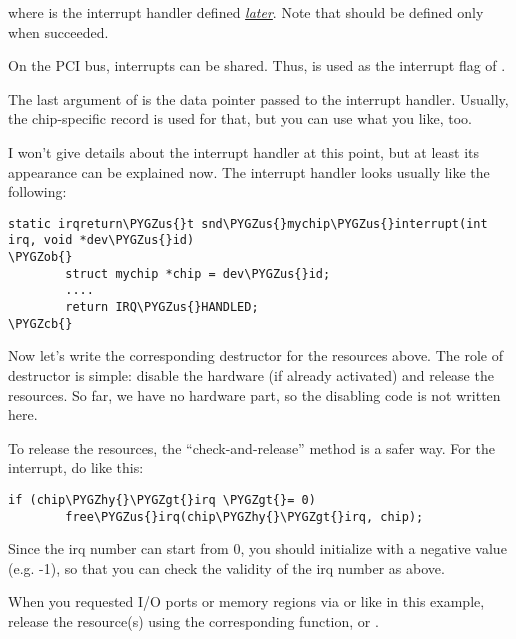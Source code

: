 \documentclass[a4paper,8pt,english]{sphinxmanual}
\def\PYGZus{\char`\_}
\def\PYGZob{\char`\{}
\def\PYGZcb{\char`\}}
\def\PYGZgt{\char`\>}
\def\PYGZhy{\char`\-}
\begin{document}
where  is the interrupt handler
defined {\hyperref[sound/kernel\string-api/writing\string-an\string-alsa\string-driver:pcm\string-interface\string-interrupt\string-handler]{\emph{later}}}. Note that
 should be defined only when 
succeeded.

On the PCI bus, interrupts can be shared. Thus,  is used
as the interrupt flag of .

The last argument of  is the data pointer
passed to the interrupt handler. Usually, the chip-specific record is
used for that, but you can use what you like, too.

I won't give details about the interrupt handler at this point, but at
least its appearance can be explained now. The interrupt handler looks
usually like the following:

\begin{Verbatim}[commandchars=\\\{\}]
static irqreturn\PYGZus{}t snd\PYGZus{}mychip\PYGZus{}interrupt(int irq, void *dev\PYGZus{}id)
\PYGZob{}
        struct mychip *chip = dev\PYGZus{}id;
        ....
        return IRQ\PYGZus{}HANDLED;
\PYGZcb{}
\end{Verbatim}

Now let's write the corresponding destructor for the resources above.
The role of destructor is simple: disable the hardware (if already
activated) and release the resources. So far, we have no hardware part,
so the disabling code is not written here.

To release the resources, the “check-and-release” method is a safer way.
For the interrupt, do like this:

\begin{Verbatim}[commandchars=\\\{\}]
if (chip\PYGZhy{}\PYGZgt{}irq \PYGZgt{}= 0)
        free\PYGZus{}irq(chip\PYGZhy{}\PYGZgt{}irq, chip);
\end{Verbatim}

Since the irq number can start from 0, you should initialize
 with a negative value (e.g. -1), so that you can check
the validity of the irq number as above.

When you requested I/O ports or memory regions via
 or
 like in this example, release the
resource(s) using the corresponding function,
 or
.
\end{document}
